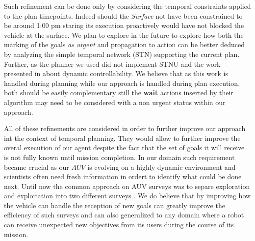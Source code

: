 Such refinement can be done only by considering the temporal
constraints applied to the plan timepoints. Indeed should the 
{\em Surface} not have been constrained to be around 1:00 pm staring
its execution proactively would have not blocked the vehicle at the
surface. We plan to explore in the future to explore how both the
marking of the goals {\em as urgent} and propagation to action  can be
better deduced by analyzing the simple temporal network (STN)
supporting the current plan. Further, as the planner we used did not
implement STNU and the work presented in \cite{morris01} about dynamic
controllability. We believe that as this work is handled during
planning while our approach is handled during plan execution, both
should be easily complementary still the {\bf wait} actions inserted
by their algorithm may need to be considered with a non
urgent status within our approach. 

All of these refinements are considered in order to further improve
our approach int the context of temporal planning. They would allow to
further improve the overal execution of our agent despite the fact
that the set of goals it will receive is not fully known until mission 
completion. In our domain such requirement became crucial as our $AUV$
is evolving on a highly dynamic environment and scientists often need
fresh information in ordert to identify what could be done next. Until
now the common approach on AUV surveys was to separe exploration and
exploitation into two different surveys \cite{Yoerger01012007}. We do
believe that by improving how the vehicle can handle the reception of
new goals can  greatly improve the efficiency of such surveys and can
also generalized to any domain where a robot can receive unexpected
new objectives from its users during the course  of its mission.






